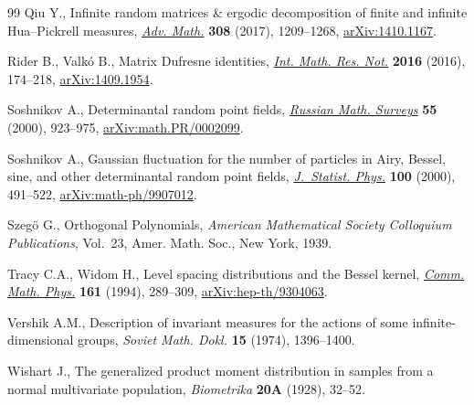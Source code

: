 \documentclass[pdftex]{sigma}
\numberwithin{equation}{section}
\begin{document}
\begin{thebibliography}{99}
Qiu Y., Infinite random matrices \& ergodic decomposition of finite and
 infinite {H}ua--{P}ickrell measures, \href{https://doi.org/10.1016/j.aim.2017.01.003}{\textit{Adv. Math.}} \textbf{308} (2017),
 1209--1268, \href{https://arxiv.org/abs/1410.1167}{arXiv:1410.1167}.

Rider B., Valk\'{o} B., Matrix {D}ufresne identities, \href{https://doi.org/10.1093/imrn/rnv127}{\textit{Int. Math. Res.
 Not.}} \textbf{2016} (2016), 174--218, \href{https://arxiv.org/abs/1409.1954}{arXiv:1409.1954}.

Soshnikov A., Determinantal random point fields, \href{https://doi.org/10.1070/rm2000v055n05ABEH000321}{\textit{Russian Math. Surveys}}
 \textbf{55} (2000), 923--975, \href{https://arxiv.org/abs/math.PR/0002099}{arXiv:math.PR/0002099}.

Soshnikov A., Gaussian fluctuation for the number of particles in {A}iry,
 {B}essel, sine, and other determinantal random point fields,
 \href{https://doi.org/10.1023/A:1018672622921}{\textit{J.~Statist. Phys.}} \textbf{100} (2000), 491--522,
 \href{https://arxiv.org/abs/math-ph/9907012}{arXiv:math-ph/9907012}.

Szeg\"{o} G., Orthogonal {P}olynomials, \textit{American Mathematical Society
 Colloquium Publications}, Vol.~23, Amer. Math. Soc., New York, 1939.

Tracy C.A., Widom H., Level spacing distributions and the {B}essel kernel,
 \href{https://doi.org/10.1007/BF02099779}{\textit{Comm. Math. Phys.}} \textbf{161} (1994), 289--309,
 \href{https://arxiv.org/abs/hep-th/9304063}{arXiv:hep-th/9304063}.

Vershik A.M., Description of invariant measures for the actions of some
 infinite-dimensional groups, \textit{Soviet Math. Dokl.} \textbf{15} (1974),
 1396--1400.

Wishart J., The generalized product moment distribution in samples from a
 normal multivariate population, \textit{Biometrika} \textbf{20A} (1928),
 32--52.

\end{thebibliography}\LastPageEnding
\end{document}
